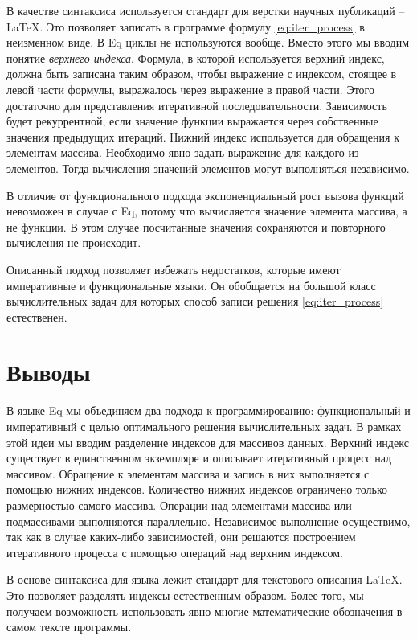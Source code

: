 \documentclass[a4paper]{llncs}
\begin{document}
В качестве синтаксиса используется стандарт для верстки научных публикаций -- \LaTeX. Это позволяет записать в программе формулу \eqref{eq:iter_process} в неизменном виде. В Eq циклы не используются вообще. Вместо этого мы вводим понятие \emph{верхнего индекса}. Формула, в которой используется верхний индекс, должна быть записана таким образом, чтобы выражение с индексом, стоящее в левой части формулы, выражалось через выражение в правой части. Этого достаточно для представления итеративной последовательности. Зависимость будет рекуррентной, если значение функции выражается через собственные значения предыдущих итераций.
Нижний индекс используется для обращения к элементам массива. Необходимо явно задать выражение для каждого из элементов. Тогда вычисления значений элементов могут выполняться независимо.

В отличие от функционального подхода экспоненциальный рост вызова функций невозможен в случае с Eq, потому что вычисляется значение элемента массива, а не функции. В этом случае посчитанные значения сохраняются и повторного вычисления не происходит.

Описанный подход позволяет избежать недостатков, которые имеют императивные и функциональные языки. Он обобщается на большой класс вычислительных задач для которых способ записи решения \eqref{eq:iter_process} естественен. 

\section*{Выводы}
В языке Eq мы объединяем два подхода к программированию: функциональный и императивный с целью оптимального решения вычислительных задач. В рамках этой идеи мы вводим разделение индексов для массивов данных. Верхний индекс существует в единственном экземпляре и описывает итеративный процесс над массивом. Обращение к элементам массива и запись в них выполняется с помощью нижних индексов. Количество нижних индексов ограничено только размерностью самого массива. Операции над элементами массива или подмассивами выполняются параллельно. Независимое выполнение осуществимо, так как в случае каких-либо зависимостей, они решаются построением итеративного процесса с помощью операций над верхним индексом.

В основе синтаксиса для языка лежит стандарт для текстового описания \LaTeX. Это позволяет разделять индексы естественным образом. Более того, мы получаем возможность использовать явно многие математические обозначения в самом тексте программы.
\end{document}
